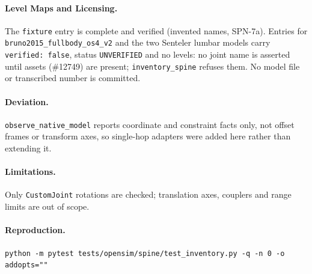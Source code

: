 \paragraph{Level Maps and Licensing.} The \texttt{fixture} entry is complete
and verified (invented names, SPN-7a). Entries for
\texttt{bruno2015\_fullbody\_os4\_v2} and the two Senteler lumbar models carry
\texttt{verified: false}, status \texttt{UNVERIFIED} and no levels: no joint
name is asserted until assets (\#12749) are present; \texttt{inventory\_spine}
refuses them. No model file or transcribed number is committed.

\paragraph{Deviation.} \texttt{observe\_native\_model} reports coordinate and
constraint facts only, not offset frames or transform axes, so single-hop
adapters were added here rather than extending it.

\paragraph{Limitations.} Only \texttt{CustomJoint} rotations are checked;
translation axes, couplers and range limits are out of scope.

\paragraph{Reproduction.}
\begin{verbatim}
python -m pytest tests/opensim/spine/test_inventory.py -q -n 0 -o addopts=""
\end{verbatim}
